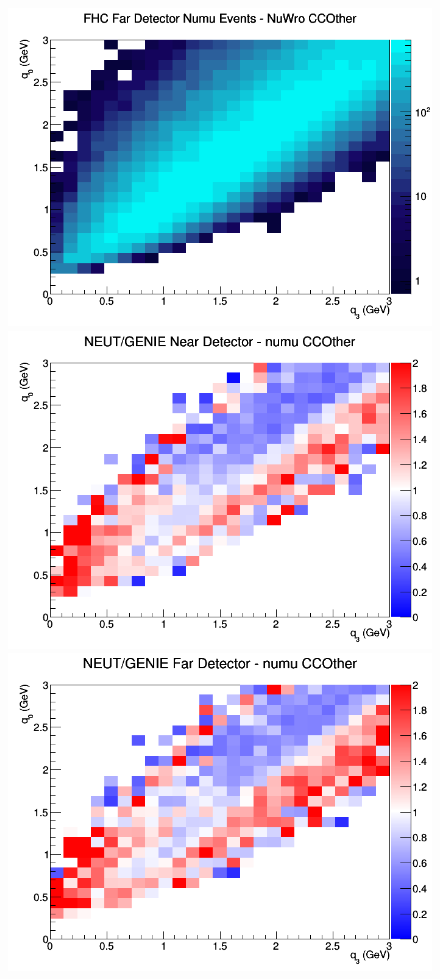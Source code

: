 \begin{figure}[h]
\endminipage
{}
\includegraphics[width=\linewidth]{eff_q0_q3/LAr/CCOther_FHC_FD_numu_q3_q0_NuWro.png}
\endminipage
\newline
{}
\includegraphics[width=\linewidth]{eff_q0_q3/LAr/ratios/CCOther_NEUT_GENIE_numu_near_q3_q0.png}
\endminipage
{}
\includegraphics[width=\linewidth]{eff_q0_q3/LAr/ratios/CCOther_NEUT_GENIE_numu_far_q3_q0.png}

\end{figure}
